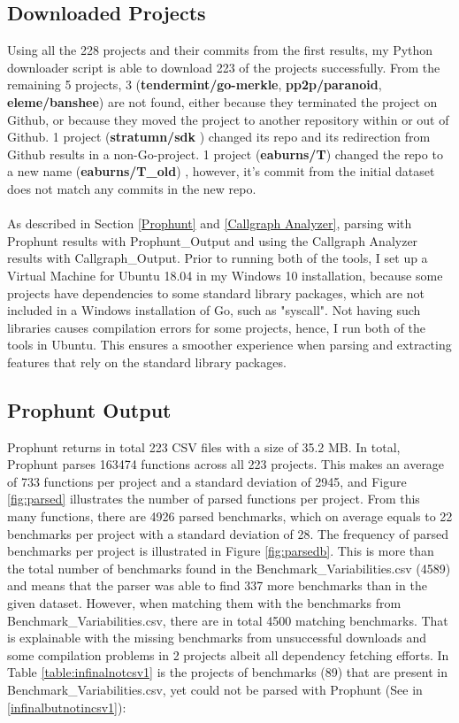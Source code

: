 \documentclass{seal_thesis}
\begin{document}
\subsection{Downloaded Projects}
Using all the 228 projects and their commits from the first results, my Python downloader script is able to download 223 of the projects successfully. From the remaining 5 projects, 3 (\textbf{tendermint/go-merkle}, \textbf{pp2p/paranoid}, \textbf{eleme/banshee}) are not found, either because they terminated the project on Github, or because they moved the project to another repository within or out of Github. 1 project (\textbf{stratumn/sdk} \cite{stratumn/sdk}) changed its repo and its redirection from Github results in a non-Go-project. 1 project (\textbf{eaburns/T}) changed the repo to a new name (\textbf{eaburns/T\_old}) \cite{eaburns/T_old}, however, it's commit from the initial dataset does not match any commits in the new repo.\\
\\
As described in Section \ref{Prophunt} and \ref{Callgraph Analyzer}, parsing with Prophunt results with Prophunt\_Output and using the Callgraph Analyzer results with Callgraph\_Output. Prior to running both of the tools, I set up a Virtual Machine for Ubuntu 18.04 in my Windows 10 installation, because some projects have dependencies to some standard library packages, which are not included in a Windows installation of Go, such as "syscall". Not having such libraries causes compilation errors for some projects, hence, I run both of the tools in Ubuntu. This ensures a smoother experience when parsing and extracting features that rely on the standard library packages.\\

\subsection{Prophunt Output}

Prophunt returns in total 223 CSV files with a size of 35.2 MB. In total, Prophunt parses 163474 functions across all 223 projects. This makes an average of 733 functions per project and a standard deviation of 2945, and Figure \ref{fig:parsed} illustrates the number of parsed functions per project. From this many functions, there are 4926 parsed benchmarks, which on average equals to 22 benchmarks per project with a standard deviation of 28. The frequency of parsed benchmarks per project is illustrated in Figure \ref{fig:parsedb}. This is more than the total number of benchmarks found in the Benchmark\_Variabilities.csv (4589) and means that the parser was able to find 337 more benchmarks than in the given dataset. However, when matching them with the benchmarks from Benchmark\_Variabilities.csv, there are in total 4500 matching benchmarks. That is explainable with the missing benchmarks from unsuccessful downloads and some compilation problems in 2 projects albeit all dependency fetching efforts. In Table \ref{table:infinalnotcsv1} is the projects of benchmarks (89) that are present in Benchmark\_Variabilities.csv, yet could not be parsed with Prophunt (See in \ref{infinalbutnotincsv1}):\\
\end{document}
